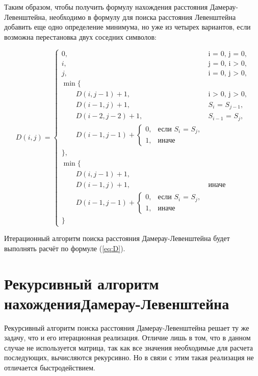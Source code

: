 Таким образом, чтобы получить формулу нахождения расстояния Дамерау-Левенштейна, необходимо в формулу для поиска расстояния Левенштейна добавить еще одно определение минимума, но уже из четырех вариантов, если возможна перестановка двух соседних символов:

\begin{equation}
	\label{eq:D}
	D(i, j) = \begin{cases}
		
		0, &\text{i = 0, j = 0,}\\
		i, &\text{j = 0, i > 0,}\\
		j, &\text{i = 0, j > 0,}\\
		
		\min \lbrace \\
		\qquad D(i, j-1) + 1,&\text{i > 0, j > 0,}\\
		\qquad D(i-1, j) + 1,&\text{$S_{i}$ = $S_{j-1}$,}\\
		\qquad D(i-2, j-2) + 1,&\text{$S_{i-1}$ = $S_{j}$,}\\
		\qquad D(i-1, j-1) + \begin{cases}
                        		0, &\text{если $S_{i}$ = $S_{j}$,}\\
                        		1, &\text{иначе}
                        	\end{cases}\\
		\rbrace,\\
		
		\min \lbrace \\
		\qquad D(i, j-1) + 1,\\
		\qquad D(i-1, j) + 1,&\text{иначе}\\
		\qquad D(i-1, j-1) + \begin{cases}
                        		0, &\text{если $S_{i}$ = $S_{j}$,}\\
                        		1, &\text{иначе}
                        	\end{cases}\\
		\rbrace
	\end{cases}
\end{equation}

Итерационный алгоритм поиска расстояния Дамерау-Левенштейна будет выполнять расчёт по формуле (\ref{eq:D}).


\section{Рекурсивный алгоритм нахождения Дамерау-Левенштейна}
Рекурсивный алгоритм поиска расстояния Дамерау-Левенштейна решает ту же задачу, что и его итерационная реализация. Отличие лишь в том, что в данном случае не используется матрица, так как все значения необходимые для расчета последующих, вычисляются рекурсивно. Но в связи с этим такая реализация не отличается быстродействием.


